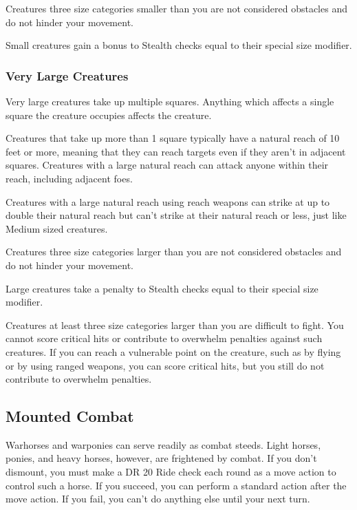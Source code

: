              Creatures three size categories smaller than you are not considered obstacles and do not hinder your movement.

             Small creatures gain a bonus to Stealth checks equal to their special size modifier.

        \subsubsection{Very Large Creatures}
             Very large creatures take up multiple squares. Anything which affects a single square the creature occupies affects the creature.

             Creatures that take up more than 1 square typically have a natural reach of 10 feet or more, meaning that they can reach targets even if they aren't in adjacent squares. Creatures with a large natural reach can attack anyone within their reach, including adjacent foes.

            Creatures with a large natural reach using reach weapons can strike at up to double their natural reach but can't strike at their natural reach or less, just like Medium sized creatures.

             Creatures three size categories larger than you are not considered obstacles and do not hinder your movement.

             Large creatures take a penalty to Stealth checks equal to their special size modifier.

             Creatures at least three size categories larger than you are difficult to fight. You cannot score critical hits or contribute to overwhelm penalties against such creatures. If you can reach a vulnerable point on the creature, such as by flying or by using ranged weapons, you can score critical hits, but you still do not contribute to overwhelm penalties.

    \subsection{Mounted Combat}\label{Mounted Combat}
         Warhorses and warponies can serve readily as combat steeds. Light horses, ponies, and heavy horses, however, are frightened by combat. If you don't dismount, you must make a DR 20 Ride check each round as a move action to control such a horse. If you succeed, you can perform a standard action after the move action. If you fail, you can't do anything else until your next turn.

